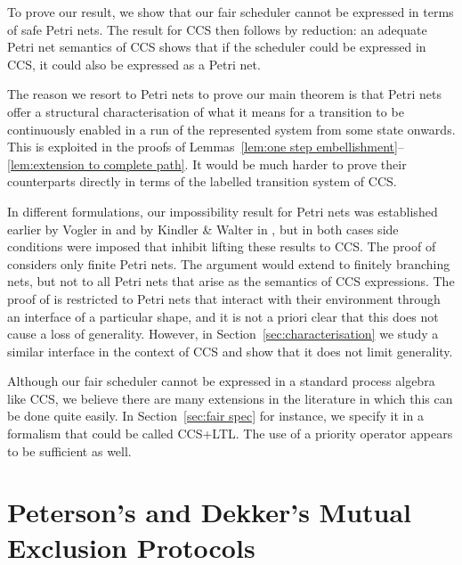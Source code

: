 \documentclass[smallcondensed]{svjour3}
\newcommand{\Sect}[1]{Section~\ref{sec:#1}}
\newcommand{\mand}{\&\xspace}
\newcounter {part}
\begin{document}
To prove our result, we show that our fair scheduler cannot be expressed in terms of  safe
Petri nets. The result for CCS then follows by reduction: an adequate Petri net semantics of CCS shows that
if the scheduler could be expressed in CCS, it could also be expressed as a Petri net.

The reason we resort to Petri nets to prove our main theorem is that Petri nets offer a structural
characterisation of what it means for a transition to be continuously enabled in a run of the
represented system from some state onwards. This is exploited in the proofs of
Lemmas~\ref{lem:one step embellishment}--\ref{lem:extension to complete path}.
It would be much harder to prove their counterparts directly in terms of the
labelled transition system of CCS\@.

In different formulations, our impossibility result for Petri nets was established earlier by
Vogler in \cite{Vogler02} and by Kindler \mand Walter in \cite{KW97}, but in both cases side
conditions were imposed that inhibit lifting these results to CCS\@.
The proof of \cite[Lemma 6.1]{Vogler02} considers only finite Petri nets.
The argument would extend to finitely branching nets, but not to all Petri nets that arise as the
semantics of CCS expressions. The proof of \cite{KW97} is restricted to Petri nets that interact
with their environment through an interface of a particular shape, and it is not a priori clear that
this does not cause a loss of generality. However, in \Sect{characterisation} we study a similar interface in
the context of CCS and show that it does not limit generality.

Although our fair scheduler cannot be expressed in a standard process algebra like CCS,
we believe there are many extensions in the literature in which this can be done quite easily.
In \Sect{fair spec} for instance, we specify it in a formalism that could be called CCS+LTL.
The use of a priority operator appears to be sufficient as well.\vspace{-6pt}

\section{Peterson's and Dekker's Mutual Exclusion Protocols}
\end{document}
